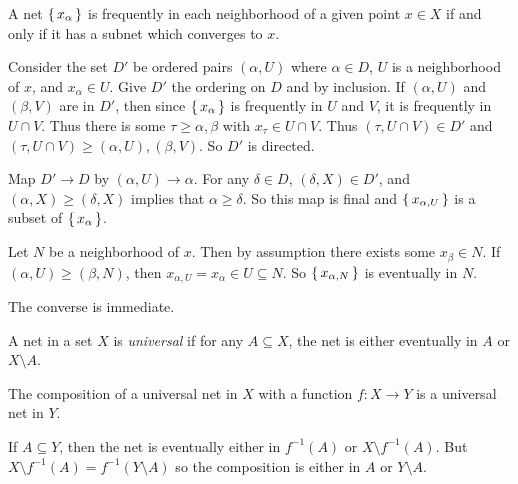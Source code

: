\documentclass[letterpaper, 11pt, oneside]{book}
\begin{document}
\begin{prop}
  A net $\set{x_{\alpha}}$ is frequently in each neighborhood of a given point $x \in X$ if and only if it has a subnet which converges to $x$.
\end{prop}
\begin{pf}
  Consider the set $D'$ be ordered pairs $(\alpha, U)$ where $\alpha \in D$, $U$ is a neighborhood of $x$, and $x_{\alpha} \in U$.
  Give $D'$ the ordering on $D$ and by inclusion.
  If $(\alpha, U)$ and $(\beta, V)$ are in $D'$, then since $\set{x_{\alpha}}$ is frequently in $U$ and $V$, it is frequently in $U \cap V$.
  Thus there is some $\tau \geq \alpha, \beta$ with $x_{\tau} \in U \cap V$.
  Thus $(\tau, U \cap V) \in D'$ and $(\tau, U \cap V) \geq (\alpha, U), (\beta, V)$.
  So $D'$ is directed.

  Map $D' \to D$ by $(\alpha, U) \to \alpha$.
  For any $\delta \in D$, $(\delta, X) \in D'$, and $(\alpha, X) \geq (\delta, X)$ implies that $\alpha \geq \delta$.
  So this map is final and $\set{x_{\alpha, U}}$ is a subset of $\set{x_{\alpha}}$.

  Let $N$ be a neighborhood of $x$.
  Then by assumption there exists some $x_{\beta} \in N$.
  If $(\alpha, U) \geq (\beta, N)$, then $x_{\alpha, U} = x_{\alpha} \in U \subseteq N$.
  So $\set{x_{\alpha, N}}$ is eventually in $N$.

  The converse is immediate.
\end{pf}

\begin{defn}
  A net in a set $X$ is \emph{universal} if for any $A \subseteq X$, the net is either eventually in $A$ or $X \setminus A$.
\end{defn}

\begin{prop}\label{prop: composition_with_universal_is_universal}
  The composition of a universal net in $X$ with a function $f\colon X \to Y$ is a universal net in $Y$.
\end{prop}
\begin{pf}
  If $A \subseteq Y$, then the net is eventually either in $f^{-1}(A)$ or $X \setminus f^{-1}(A)$.
  But $X \setminus f^{-1}(A) = f^{-1}(Y \setminus A)$ so the composition is either in $A$ or $Y \setminus A$.
\end{pf}

\clearpage
\end{document}
